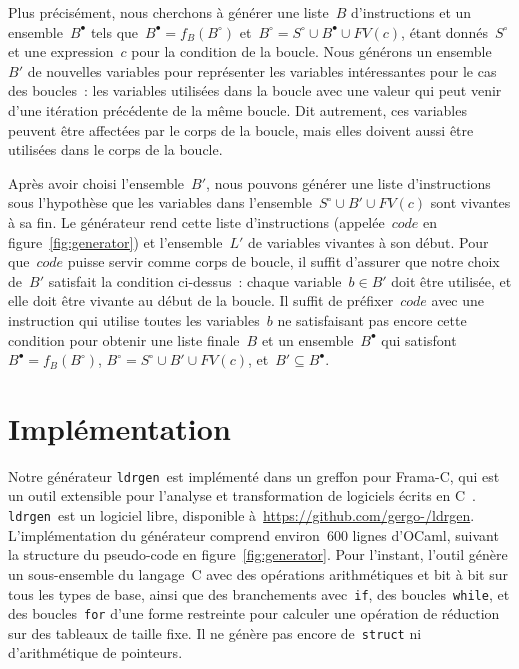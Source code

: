 \documentclass[a4paper]{easychair}
\newcommand\ldrgen{\texttt{ldrgen}}
\newcommand{\liveout}[1]{\ensuremath{#1^{\circ}}}
\newcommand{\livein}[1]{\ensuremath{#1^{\bullet}}}
\def\union{\cup}
\begin{document}

Plus précisément, nous cherchons à générer une liste~\(B\) d'instructions et
un ensemble~\(\livein{B}\) tels que~\(\livein{B} = f_B(\liveout{B})\)
et~\(\liveout{B} = \liveout{S} \union \livein{B} \union FV(c)\), étant
donnés~\(\liveout{S}\) et une expression~\(c\) pour la condition de la
boucle. Nous générons un ensemble~\(B'\) de nouvelles variables pour
représenter les variables intéressantes pour le cas des boucles~: les
variables utilisées dans la boucle avec une valeur qui peut venir d'une
itération précédente de la même boucle. Dit autrement, ces variables peuvent
être affectées par le corps de la boucle, mais elles doivent aussi être utilisées
dans le corps de la boucle.

Après avoir choisi l'ensemble~\(B'\), nous pouvons générer une liste
d'instructions sous l'hypothèse que les variables dans
l'ensemble~\(\liveout{S} \union B' \union FV(c)\) sont vivantes à sa
fin.
Le générateur rend cette liste d'instructions (appelée~\(code\) en
figure~\ref{fig:generator}) et l'ensemble~\(L'\) de variables vivantes à son
début. Pour que~\(code\) puisse servir comme corps de boucle, il suffit
d'assurer que notre choix de~\(B'\) satisfait la condition ci-dessus~:
chaque variable~\(b \in B'\) doit être utilisée, et elle doit être vivante
au début de la boucle. Il suffit de préfixer~\(code\) avec une instruction
qui utilise toutes les variables~\(b\) ne satisfaisant pas encore cette condition pour
obtenir une liste finale~\(B\) et un ensemble~\(\livein{B}\) qui satisfont
\(\livein{B} = f_B(\liveout{B})\), \(\liveout{B} = \liveout{S} \union B'
\union FV(c)\), et~\(B' \subseteq \livein{B}\).


\section{Implémentation}

Notre générateur \ldrgen\ est implémenté dans un greffon pour Frama-C, qui
est un outil extensible pour l'analyse et transformation de logiciels écrits
en C~\cite{frama-c}. \ldrgen\ est un logiciel libre, disponible
à~\url{https://github.com/gergo-/ldrgen}. L'implémentation du générateur
comprend environ~600 lignes d'OCaml, suivant la structure du pseudo-code en
figure~\ref{fig:generator}. Pour l'instant, l'outil génère un sous-ensemble
du langage~C avec des opérations arithmétiques et bit à bit sur tous les
types de base, ainsi que des branchements avec~\texttt{if}, des
boucles~\texttt{while}, et des boucles~\texttt{for} d'une forme restreinte
pour calculer une opération de réduction sur des tableaux de taille fixe. Il
ne génère pas encore de~\texttt{struct} ni d'arithmétique de pointeurs.
\end{document}
